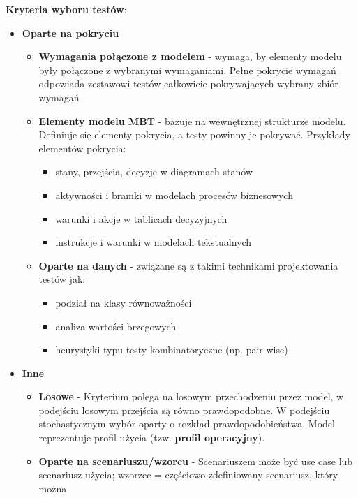 \documentclass[../main.tex]{subfiles}
\begin{document}
    \textbf{Kryteria wyboru testów}:
    \begin{itemize}
        \item \textbf{Oparte na pokryciu}
        \begin{itemize}
            \item \textbf{Wymagania połączone z modelem} - wymaga, by elementy modelu były połączone z wybranymi
            wymaganiami. Pełne pokrycie wymagań odpowiada zestawowi testów całkowicie pokrywających wybrany zbiór wymagań
            \item \textbf{Elementy modelu MBT} - bazuje na wewnętrznej strukturze modelu. Definiuje się elementy
            pokrycia, a testy powinny je pokrywać. Przykłady elementów pokrycia:
            \begin{itemize}
                \item stany, przejścia, decyzje w diagramach stanów
                \item aktywności i bramki w modelach procesów biznesowych
                \item warunki i akcje w tablicach decyzyjnych
                \item instrukcje i warunki w modelach tekstualnych
            \end{itemize}
            \item \textbf{Oparte na danych} - związane są z takimi technikami projektowania testów jak:
            \begin{itemize}
                \item podział na klasy równoważności
                \item analiza wartości brzegowych
                \item heurystyki typu testy kombinatoryczne (np. pair-wise)
            \end{itemize}
        \end{itemize}
        \item \textbf{Inne}
        \begin{itemize}
            \item \textbf{Losowe} - Kryterium polega na losowym przechodzeniu przez model, w podejściu losowym przejścia są równo
            prawdopodobne. W podejściu stochastycznym wybór oparty o rozkład prawdopodobieństwa. Model reprezentuje profil
            użycia (tzw. \textbf{profil operacyjny}).
            \item \textbf{Oparte na scenariuszu/wzorcu} - Scenariuszem może być use case lub
            scenariusz użycia; wzorzec = częściowo zdefiniowany scenariusz, który można

\end{itemize}
\end{itemize}
\end{document}
